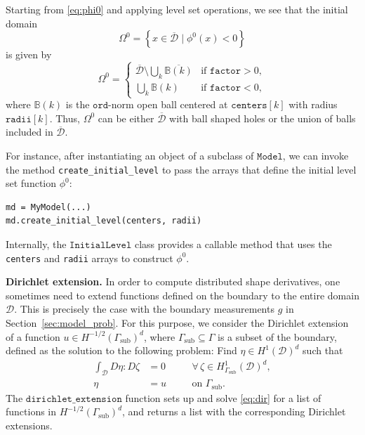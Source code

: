 \documentclass[iicol,pdflatex,sn-mathphys-ay]{sn-jnl}%
\theoremstyle{thmstyleone}%
\theoremstyle{thmstyletwo}%
\theoremstyle{thmstylethree}%
\begin{document}
Starting from \eqref{eq:phi0} and applying level set operations,
we see that the initial domain
\[
	\Omega^0=\left\{x\in\overline{\mathcal{D}}\mid\phi^0(x)<0\right\}
\]
is given by
\[
	\Omega^0 = 
	\begin{cases}
	\overline{\mathcal{D}}\setminus\bigcup_k \overline{\mathbb{B}(k)}
		& \text{if } \texttt{factor} > 0, \\
	\bigcup_k \mathbb{B}(k)
		& \text{if } \texttt{factor} < 0,
	\end{cases}
\]
where $\mathbb{B}(k)$ is the $\texttt{ord}$-norm open ball
centered at $\texttt{centers}[k]$ with radius $\texttt{radii}[k]$.
Thus, $\Omega^0$ can be either
$\overline{\mathcal{D}}$ with ball shaped holes
or the union of balls included in $\overline{\mathcal{D}}$.

For instance,
after instantiating an object of a subclass of $\texttt{Model}$,
we can invoke the method \texttt{create\_initial\_level} to pass
the arrays that define the initial level set function $\phi^0$:
\begin{lstlisting}
md = MyModel(...)
md.create_initial_level(centers, radii)	
\end{lstlisting}
Internally, the $\texttt{InitialLevel}$ class
provides a callable method that uses the
\texttt{centers} and \texttt{radii} arrays to construct $\phi^0$.

\vspace{0.5cm}
\noindent\textbf{Dirichlet extension.}
In order to compute distributed shape derivatives,
one sometimes need to extend functions defined on
the boundary to the entire domain $\mathcal{D}$. 
This is precisely the case with the boundary measurements $g$ in
Section~\ref{sec:model_prob}. 
For this purpose, we consider the Dirichlet extension of a function
$u\in H^{-1/2}(\Gamma_{\text{sub}})^{d}$,
where $\Gamma_{\text{sub}}\subseteq\Gamma$ is a subset of the boundary,
defined as the solution to the following problem:
Find $\eta\in H^1(\mathcal{D})^{d}$ such that
\begin{equation}\label{eq:dir}
\begin{aligned}
	\int_{\mathcal{D}} D\eta \colon\! D\zeta &= 0
	&&\quad\forall\, \zeta\in H^1_{\Gamma_{\text{sub}}}(\mathcal{D})^{d}, \\
	\eta &= u &&\quad \text{on } \Gamma_{\text{sub}}.
\end{aligned}
\end{equation}
The $\texttt{dirichlet\_extension}$ function 
sets up and solve \eqref{eq:dir} for a list
of functions in $H^{-1/2}(\Gamma_{\text{sub}})^{d}$, and returns
a list with the corresponding Dirichlet extensions.
\end{document}
